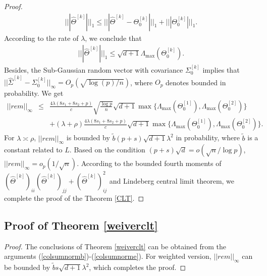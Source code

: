 \documentclass[review]{elsarticle}
\newcommand{\1}{{\bf 1}}
\newcommand{\0}{{\bf 0}}
\newcommand{\bqa}{\begin{eqnarray}}
\newcommand{\eqa}{\end{eqnarray}}
\newcommand{\non}{\nonumber\\}
\newtheorem{proof}{Proof}
\begin{document}
\begin{appendices}
\begin{proof}
\bqa
|||   \widehat{\Theta}^{[k]}  |||_1\leq|||   \widehat{\Theta}^{[k]} - \Theta_0^{[k]}|||_1+|||\Theta_0^{[k]}|||_1.
\eqa
 According to the rate of $\lambda$, we conclude that
\bqa\label{colsumnorme}
|||   \widehat{\Theta}^{[k]}  |||_1\leq \sqrt{d+1}\Lambda_{\max}(\Theta_0^{[k]}).
\eqa
 Besides, the Sub-Gaussian random vector with covariance $\Sigma_0^{[k]}$ implies that $||\widehat\Sigma^{[k]}-\Sigma_0^{[k]}||_{\infty}=O_p(\sqrt{\log(p)/n})$, where $O_p$ denotes bounded in probability.
 We get
\bqa
||rem||_{\infty}&\leq&\frac{4\lambda(8s_1+8s_2+p)}{c}\sqrt{\frac{\log{p}}{n}}
\sqrt{d+1}\max\{\Lambda_{\max}(\Theta_0^{[1]}),\Lambda_{\max}(\Theta_0^{[2]})\}\ \non
&&+(\lambda+\rho)\frac{4\lambda(8s_1+8s_2+p)}{c}\sqrt{d+1}
\max\{\Lambda_{\max}(\Theta_0^{[1]}),\Lambda_{\max}(\Theta_0^{[2]})\}.
\eqa
 For $\lambda\asymp \rho$, $||rem||_{\infty}$ is bounded by $\tilde{b}(p+s)\sqrt{d+1}\lambda^2$ in probability, where $\tilde b$ is a constant related to $L$.
 Based on the condition $(p+s)\sqrt{d}=o(\sqrt{n}/\log{p})$, $||rem||_{\infty}=o_{p}(1/\sqrt{n})$.
 According to the bounded fourth moments of $(\widehat{\Theta}^{[k]})_{ii}(\widehat{\Theta}^{[k]})_{jj}
 +(\widehat{\Theta}^{[k]})_{ij}^2$ and Lindeberg central limit theorem, we complete the proof of the Theorem \ref{CLT}.

\end{proof}

\subsection{Proof of Theorem \ref{weiverclt}}

\begin{proof}
 The conclusions of Theorem \ref{weiverclt} can be obtained from the arguments (\ref{colsumnormb})-(\ref{colsumnorme}). For weighted version, $||rem||_{\infty}$ can be bounded by $\tilde{b}s\sqrt{d+1}\lambda^2$, which completes the proof.
\end{proof}



\end{appendices}
\end{document}
